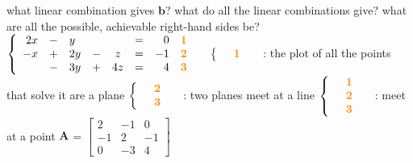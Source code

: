 \documentclass[12pt, a4paper]{article}
\begin{document}
\newline
what linear combination gives ${\mathbf{b}}$?
\newline
what do all the linear combinations give?
\newline
what are all the possible, achievable right-hand sides be?
\vspace{14pt}
\newline
\begin{math}
\left\{  
\begin{array}{rclrclrclrcl}
	2x & - & y & & & = & 0 &{\bf{\textcolor{anhao-orange}{1}}}&\\
	-x & + & 2y & - & z & = & -1 &{\bf{\textcolor{anhao-orange}{2}}}&\\
	& -& 3y & + & 4z & = & 4 &{\bf{\textcolor{anhao-orange}{3}}}&
\end{array}  
\right.
\end{math}
\newline
\begin{math}
\left\{  
\begin{array}{rcl}
	&{\bf{\textcolor{anhao-orange}{1}}}&
\end{array}  
\right.
\end{math}
\quad : the plot of all the points that solve it are a plane
\newline
\begin{math}
\left\{  
\begin{array}{rcl}
	&{\bf{\textcolor{anhao-orange}{2}}}& \\
	&{\bf{\textcolor{anhao-orange}{3}}}&
\end{array}  
\right.
\end{math}
\quad : two planes meet at a line
\newline
\begin{math}
\left\{  
\begin{array}{rcl}
	&{\bf{\textcolor{anhao-orange}{1}}}& \\
	&{\bf{\textcolor{anhao-orange}{2}}}& \\
	&{\bf{\textcolor{anhao-orange}{3}}}&
\end{array}  
\right.
\end{math}
\quad : meet at a point
\newline
${\mathbf{A}}$ = 
\begin{math}
\begin{bmatrix}
	2  & -1 & 0 \\
	-1 & 2 & -1 \\
	0 & -3 & 4
\end{bmatrix}
\end{math}
\end{document}
